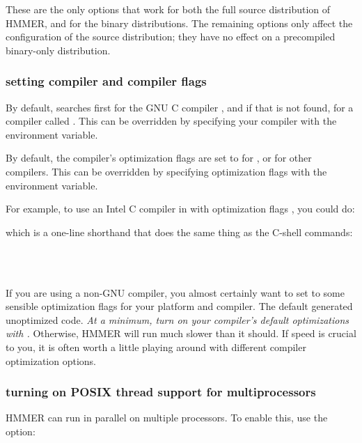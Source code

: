 These are the only  options that work for both the
full source distribution of HMMER, and for the binary
distributions. The remaining options only affect the configuration of
the source distribution; they have no effect on a precompiled
binary-only distribution.


\subsubsection{setting compiler and compiler flags}

By default,  searches first for the GNU C compiler
, and if that is not found, for a compiler called . 
This can be overridden by specifying your compiler with the 
environment variable.

By default, the compiler's optimization flags are set to
 for , or  for other compilers.
This can be overridden by specifying optimization flags with the
 environment variable. 

For example, to use an Intel C compiler in
 with 
optimization flags , you could do:


which is a one-line shorthand that does the same thing as the C-shell
commands:

\\
\\

If you are using a non-GNU compiler, you almost certainly want to set
 to some sensible optimization flags for your platform
and compiler. The  default generated unoptimized
code. \emph{At a minimum, turn on your compiler's default
optimizations with .} Otherwise, HMMER will run much
slower than it should. If speed is crucial to you, it is often worth a
little playing around with different compiler optimization options.

\subsubsection{turning on POSIX thread support for multiprocessors}

HMMER can run in parallel on multiple processors. To enable
this, use the  option:


